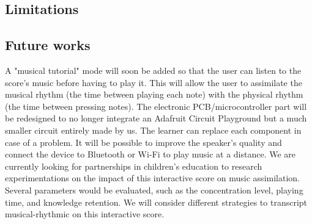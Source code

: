 \subsection{Limitations}

\subsection{Future works}

A "musical tutorial" mode will soon be added so that the user can listen to the score's
music before having to play it. This will allow the user to assimilate the musical rhythm
(the time between playing each note) with the physical rhythm (the time between
pressing notes).
The electronic PCB/microcontroller part will be redesigned to no longer integrate an
Adafruit Circuit Playground but a much smaller circuit entirely made by us. The
learner can replace each component in case of a problem. It will be possible to
improve the speaker's quality and connect the device to Bluetooth or Wi-Fi to play
music at a distance.
We are currently looking for partnerships in children's education to research
experimentations on the impact of this interactive score on music assimilation. Several
parameters would be evaluated, such as the concentration level, playing time, and
knowledge retention. We will consider different strategies to transcript musical-rhythmic on this interactive score.